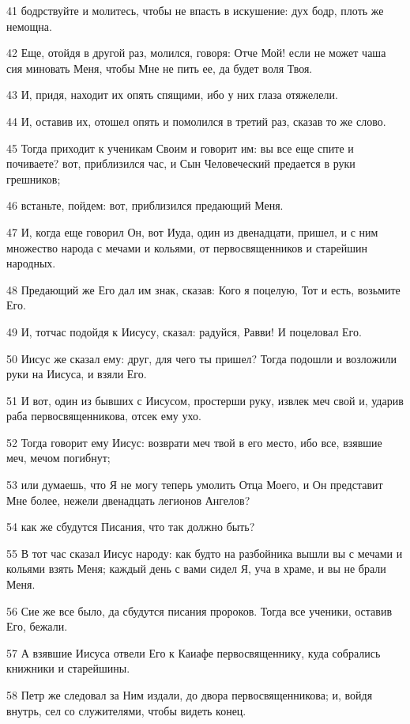 \par 41 бодрствуйте и молитесь, чтобы не впасть в искушение: дух бодр, плоть же немощна.
\par 42 Еще, отойдя в другой раз, молился, говоря: Отче Мой! если не может чаша сия миновать Меня, чтобы Мне не пить ее, да будет воля Твоя.
\par 43 И, придя, находит их опять спящими, ибо у них глаза отяжелели.
\par 44 И, оставив их, отошел опять и помолился в третий раз, сказав то же слово.
\par 45 Тогда приходит к ученикам Своим и говорит им: вы все еще спите и почиваете? вот, приблизился час, и Сын Человеческий предается в руки грешников;
\par 46 встаньте, пойдем: вот, приблизился предающий Меня.
\par 47 И, когда еще говорил Он, вот Иуда, один из двенадцати, пришел, и с ним множество народа с мечами и кольями, от первосвященников и старейшин народных.
\par 48 Предающий же Его дал им знак, сказав: Кого я поцелую, Тот и есть, возьмите Его.
\par 49 И, тотчас подойдя к Иисусу, сказал: радуйся, Равви! И поцеловал Его.
\par 50 Иисус же сказал ему: друг, для чего ты пришел? Тогда подошли и возложили руки на Иисуса, и взяли Его.
\par 51 И вот, один из бывших с Иисусом, простерши руку, извлек меч свой и, ударив раба первосвященникова, отсек ему ухо.
\par 52 Тогда говорит ему Иисус: возврати меч твой в его место, ибо все, взявшие меч, мечом погибнут;
\par 53 или думаешь, что Я не могу теперь умолить Отца Моего, и Он представит Мне более, нежели двенадцать легионов Ангелов?
\par 54 как же сбудутся Писания, что так должно быть?
\par 55 В тот час сказал Иисус народу: как будто на разбойника вышли вы с мечами и кольями взять Меня; каждый день с вами сидел Я, уча в храме, и вы не брали Меня.
\par 56 Сие же все было, да сбудутся писания пророков. Тогда все ученики, оставив Его, бежали.
\par 57 А взявшие Иисуса отвели Его к Каиафе первосвященнику, куда собрались книжники и старейшины.
\par 58 Петр же следовал за Ним издали, до двора первосвященникова; и, войдя внутрь, сел со служителями, чтобы видеть конец.
